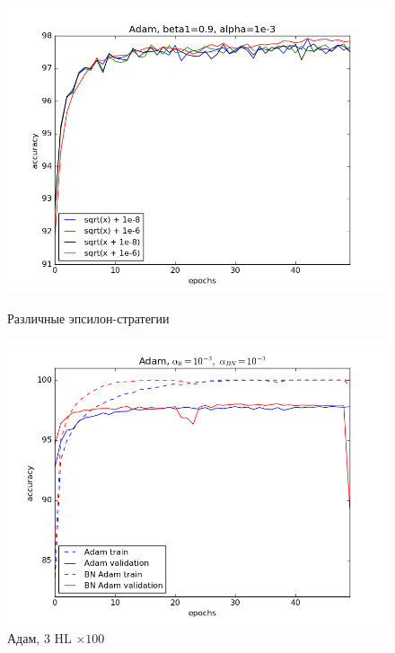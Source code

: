 \documentclass[12pt,oneside]{article}
\begin{document}
\begin{figure}[h!]
\centering
\begin{minipage}{0.45\textwidth}
\includegraphics[scale=0.45]{images/mnistEpsilon.png}
\caption{\small Различные эпсилон-стратегии}
\end{minipage} \hfill
\begin{minipage}{0.45\textwidth}
\includegraphics[scale=0.45]{images/mnistAdam1.png}
\caption{\small Адам, $3$ HL $\times 100$}
\end{minipage} \vfill
\begin{minipage}{0.45\textwidth}

\end{minipage}
\end{figure}
\end{document}

